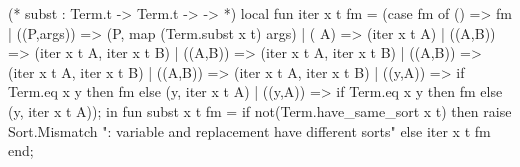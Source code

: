 \nwenddocs{}\endmoddef\nwstartdeflinemarkup{}\nwenddeflinemarkup
(* subst : Term.t -> Term.t ->  ->  *)
local
fun iter x t fm =
 (case fm of
   () => fm
 | ((P,args)) => (P, map (Term.subst x t) args)
 | ( A) => (iter x t A)
 | ((A,B)) => (iter x t A, iter x t B)
 | ((A,B)) => (iter x t A, iter x t B)
 | ((A,B)) => (iter x t A, iter x t B)
 | ((A,B)) => (iter x t A, iter x t B)
 | ((y,A)) => if Term.eq x y then fm
                    else (y, iter x t A)
 | ((y,A)) => if Term.eq x y then fm
                    else (y, iter x t A));
in
fun subst x t fm =
  if not(Term.have_same_sort x t)
  then raise Sort.Mismatch ": variable and replacement have different sorts"
  else iter x t fm
end;
\eatline
